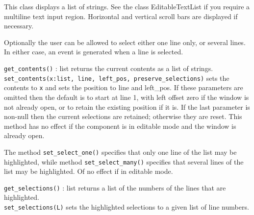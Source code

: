 
This class displays a list of strings. See the class EditableTextList
if you require a multiline text input region. Horizontal and
vertical scroll bars are displayed if necessary.

Optionally the user can be allowed to
select either one line only, or several lines. In either case, an
event is generated when a line is selected.

\texttt{get\_contents()} : list returns the current contents as a list of
strings.\\
\texttt{set\_contents(x:list, line, left\_pos, preserve\_selections)} sets the
contents to \texttt{x} and sets the position to line and left\_pos. If
these parameters are omitted then the default is to start at line 1,
with left offset zero if the window is not already open, or to retain
the existing position if it is. If the last parameter is non-null then
the current selections are retained; otherwise they are reset. This
method has no effect if the component is in editable mode and the
window is already open.


The method \texttt{set\_select\_one()} specifies that only one line of the list
may be highlighted, while method \texttt{set\_select\_many()} specifies that
several lines of the list may be highlighted. Of no effect if in editable mode.

\texttt{get\_selections()} : list returns a list of the numbers of the lines
that are highlighted.\\
\texttt{set\_selections(L)} sets the highlighted selections to a
given list of line numbers.


